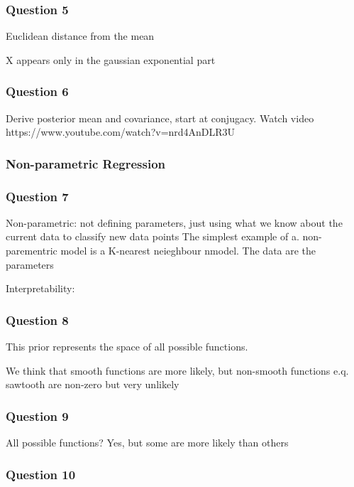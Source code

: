 \documentclass[10pt, a4paper, twocolumn]{article} %
\begin{document}
\subsubsection*{Question 5}

Euclidean distance from the mean

X appears only in the gaussian exponential part

\subsubsection*{Question 6}

Derive posterior mean and covariance, start at conjugacy. Watch video https://www.youtube.com/watch?v=nrd4AnDLR3U

\subsubsection{Non-parametric Regression}

\subsubsection*{Question 7}

Non-parametric: not defining parameters, just using what we know about the current data to classify new data points
The simplest example of a. non-parementric model is a K-nearest neieghbour nmodel.
The data are the parameters

Interpretability: 

\subsubsection*{Question 8}

This prior represents the space of all possible functions. 

We think that smooth functions are more likely, but non-smooth functions e.q. sawtooth are non-zero but very unlikely

\subsubsection*{Question 9}

All possible functions? Yes, but some are more likely than others

\subsubsection*{Question 10}
\end{document}
